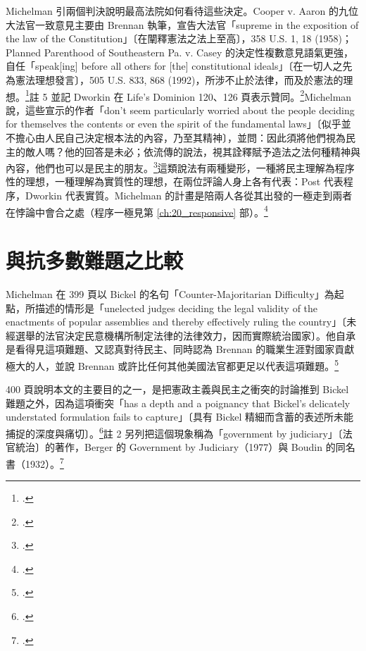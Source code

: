 Michelman 引兩個判決說明最高法院如何看待這些決定。Cooper v. Aaron 的九位大法官一致意見主要由 Brennan 執筆，宣告大法官「supreme in the exposition of the law of the Constitution」〔在闡釋憲法之法上至高〕，358 U.S. 1, 18 (1958)；Planned Parenthood of Southeastern Pa. v. Casey 的決定性複數意見語氣更強，自任「speak[ing] before all others for [the] constitutional ideals」〔在一切人之先為憲法理想發言〕，505 U.S. 833, 868 (1992)，所涉不止於法律，而及於憲法的理想。\footcite[401 nn.4--5]{michelman1998}註 5 並記 Dworkin 在 Life's Dominion 120、126 頁表示贊同。\footcite[401 n.5]{michelman1998}Michelman 說，這些宣示的作者「don't seem particularly worried about the people deciding for themselves the contents or even the spirit of the fundamental laws」〔似乎並不擔心由人民自己決定根本法的內容，乃至其精神〕，並問：因此須將他們視為民主的敵人嗎？他的回答是未必；依流傳的說法，視其詮釋賦予造法之法何種精神與內容，他們也可以是民主的朋友。\footcite[401]{michelman1998}這類說法有兩種變形，一種將民主理解為程序性的理想，一種理解為實質性的理想，在兩位評論人身上各有代表：Post 代表程序，Dworkin 代表實質。Michelman 的計畫是陪兩人各從其出發的一極走到兩者在悖論中會合之處（程序一極見第 \ref{ch:20_responsive} 部）。\footcite[401]{michelman1998}

\section{與抗多數難題之比較}
\label{sec:10_problem-4}

Michelman 在 399 頁以 Bickel 的名句「Counter-Majoritarian Difficulty」為起點，所描述的情形是「unelected judges deciding the legal validity of the enactments of popular assemblies and thereby effectively ruling the country」〔未經選舉的法官決定民意機構所制定法律的法律效力，因而實際統治國家〕。他自承是看得見這項難題、又認真對待民主、同時認為 Brennan 的職業生涯對國家貢獻極大的人，並說 Brennan 或許比任何其他美國法官都更足以代表這項難題。\footcite[399]{michelman1998}

400 頁說明本文的主要目的之一，是把憲政主義與民主之衝突的討論推到 Bickel 難題之外，因為這項衝突「has a depth and a poignancy that Bickel's delicately understated formulation fails to capture」〔具有 Bickel 精細而含蓄的表述所未能捕捉的深度與痛切〕。\footcite[400]{michelman1998}註 2 另列把這個現象稱為「government by judiciary」〔法官統治〕的著作，Berger 的 Government by Judiciary（1977）與 Boudin 的同名書（1932）。\footcite[400 n.2]{michelman1998}

